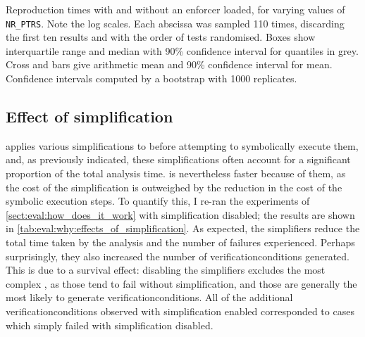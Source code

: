 \begin{sanefig}
  \caption{Reproduction times with and without an enforcer loaded, for
    varying values of \texttt{NR\_PTRS}.  Note the log scales.  Each
    abscissa was sampled 110 times, discarding the first ten results
    and with the order of tests randomised.  Boxes show interquartile
    range and median with 90\% confidence interval for quantiles in
    grey.  Cross and bars give arithmetic mean and 90\% confidence
    interval for mean.  Confidence intervals computed by a bootstrap
    with 1000 replicates.}
  \label{fig:eval:indexed_toctou:nr_ptrs}
\end{sanefig}

\subsection{Effect of {\StateMachine} simplification}

{\technique} applies various simplifications to {\StateMachines}
before attempting to symbolically execute them, and, as previously
indicated, these simplifications often account for a significant
proportion of the total analysis time.  {\implementation} is nevertheless
faster because of them, as the cost of the simplification is
outweighed by the reduction in the cost of the symbolic execution
steps.  To quantify this, I re-ran the experiments of
\autoref{sect:eval:how_does_it_work} with {\StateMachine}
simplification disabled; the results are shown in
\autoref{tab:eval:why:effects_of_simplification}.  As expected, the
simplifiers reduce the total time taken by the analysis and the number
of failures experienced.  Perhaps surprisingly, they also increased
the number of \glspl{verificationcondition} generated.  This is due to
a survival effect: disabling the simplifiers excludes the most complex
{\StateMachines}, as those tend to fail without simplification, and
those are generally the most likely to generate
\glspl{verificationcondition}.  All of the additional
\glspl{verificationcondition} observed with simplification enabled
corresponded to cases which simply failed with simplification
disabled.

